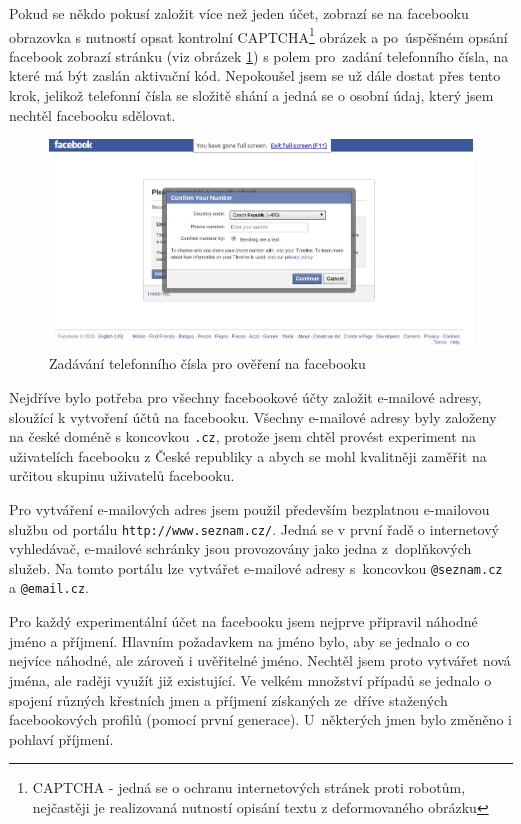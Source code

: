 \documentclass[thesis=M,czech]{FITthesis}[2013/05/10]
\begin{document}
Pokud se někdo pokusí založit více než jeden účet, zobrazí se na facebooku obrazovka s nutností opsat kontrolní CAPTCHA\footnote{CAPTCHA - jedná se o ochranu internetových stránek proti robotům, nejčastěji je realizovaná nutností opisání textu z deformovaného obrázku} obrázek a po~úspěšném opsání facebook zobrazí stránku (viz obrázek \ref{fig:fbTelephoneNubmer}) s polem pro~zadání telefonního čísla, na které má být zaslán aktivační kód. Nepokoušel jsem se už dále dostat přes tento krok, jelikož telefonní čísla se složitě shání a jedná se o osobní údaj, který jsem nechtěl facebooku sdělovat.

\begin{figure}[h]
\begin{center}
\includegraphics[width=5in]{figures/fb-telephone-number2.jpg}
\caption{Zadávání telefonního čísla pro ověření na facebooku}
\label{fig:fbTelephoneNubmer}
\end{center}
\end{figure}

Nejdříve bylo potřeba pro všechny facebookové účty založit e-mailové adresy, sloužící k vytvoření účtů na facebooku. Všechny e-mailové adresy byly založeny na české doméně s koncovkou \verb|.cz|, protože jsem chtěl provést experiment na uživatelích facebooku z České republiky a abych se mohl kvalitněji zaměřit na určitou skupinu uživatelů facebooku. 

Pro vytváření e-mailových adres jsem použil především bezplatnou e-mailovou službu od portálu \verb|http://www.seznam.cz/|. Jedná se v první řadě o internetový vyhledávač, e-mailové schránky jsou provozovány jako jedna z~doplňkových služeb. Na tomto portálu lze vytvářet e-mailové adresy s~koncovkou \verb|@seznam.cz| a \verb|@email.cz|.

Pro každý experimentální účet na facebooku jsem nejprve připravil náhodné jméno a příjmení. Hlavním požadavkem na jméno bylo, aby se jednalo o co nejvíce náhodné, ale zároveň i uvěřitelné jméno. Nechtěl jsem proto vytvářet nová jména, ale raději využít již existující. Ve velkém množství případů se jednalo o spojení různých křestních jmen a příjmení získaných ze~dříve stažených facebookových profilů (pomocí první generace). U~některých jmen bylo změněno i pohlaví příjmení. 
\end{document}
